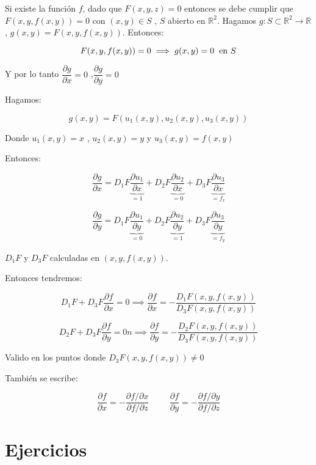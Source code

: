 \documentclass[12pt]{article}
\newcommand{\ejercicios}{\section{Ejercicios}}
\newcommand{\Rn}[1]{\mathbb{R}^{#1}}
\newcommand{\R}{\mathbb{R}}
\newcommand{\tends}{\rightarrow}
\newcommand{\parcial}[2]{\dfrac{\partial #1}{\partial #2}}
\begin{document}
	Si existe la función $f$, dado que $F(x,y,z)=0$ entonces se debe cumplir que $F(x,y,f(x,y)) = 0$ con $(x,y) \in S$ , $S$ abierto en $\Rn{2}$.
	Hagamos $g:S \subset \Rn{2} \tends \R$ , $g(x,y) = F(x,y,f(x,y))$. Entonces:
	
	$$ F(x,y,f(x,y)) = 0 \implies g(x,y) = 0 \hspace{2mm} \text{en $S$} $$
	
	Y por lo tanto $\parcial{g}{x} = 0$ ,$\parcial{g}{y} = 0$
	
	\bigskip
	
	Hagamos:
	
	$$ g(x,y) = F (u_1(x,y) , u_2(x,y) , u_3(x,y)) $$
	
	Donde $u_1(x,y) = x$ , $u_2(x,y) = y$ y $u_3(x,y) = f(x,y)$
	
	Entonces:
	
	$$ \parcial{g}{x} = D_1F \underbrace{\parcial{u_1}{x}}_\text{$=1$} + D_2F \underbrace{\parcial{u_2}{x}}_\text{$=0$} + D_3F \underbrace{\parcial{u_3}{x}}_\text{$=f_x$} $$
	
	$$ \parcial{g}{y} = D_1F \underbrace{\parcial{u_1}{y}}_\text{$=0$} + D_2F \underbrace{\parcial{u_2}{y}}_\text{$=1$} + D_3F \underbrace{\parcial{u_3}{y}}_\text{$=f_y$} $$
	
	$D_1F$ y $D_3F$ calculadas en $(x,y,f(x,y))$.
	
	\bigskip
	
	Entonces tendremos:
	
	$$ D_1F + D_3F \parcial{f}{x} = 0 
	\implies \parcial{f}{x} = - \dfrac{D_1 F(x,y,f(x,y))}{D_3 F(x,y,f(x,y))} $$
	
	$$ D_2F + D_3F \parcial{f}{y} = 0n \implies \parcial{f}{y} = - \dfrac{D_2 F(x,y,f(x,y))}{D_3 F(x,y,f(x,y))} $$
	
	Valido en los puntos donde $D_3 F(x,y,f(x,y)) \neq 0$
	
	\bigskip
	
	También se escribe:
	
	$$ \parcial{f}{x} = - \dfrac{\partial f/\partial x}{\partial f/\partial z} \hspace{1cm} \parcial{f}{y} = - \dfrac{\partial f/\partial y}{\partial f/\partial z} $$
	
	\ejercicios
	
\end{document}
